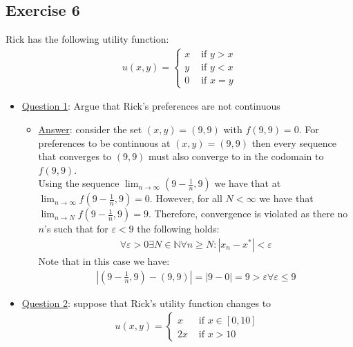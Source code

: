 \documentclass{article}
\begin{document}
\subsection{Exercise 6}
Rick has the following utility function:
\begin{gather*}
  u(x,y) =
  \begin{cases}
    x & \text{ if } y > x \\
    y & \text{ if } y < x \\
    0 & \text{ if } x = y
   \end{cases}
\end{gather*}
\par \vspace{0.3em}
\begin{itemize}
  \item  \underline{Question 1}: Argue that Rick's preferences are not continuous
  \begin{itemize}
    \item  \underline{Answer}: consider the set $(x,y) = (9,9)$ with $f(9,9) = 0$. For preferences to be continuous at $(x,y) = (9,9)$ then every sequence that converges to $(9,9)$ must also converge to in the codomain to $f(9,9)$.\\ Using the sequence $\lim_{n \rightarrow \infty} (9 - \tfrac{1}{n}, 9)$ we have that at $\lim_{n \rightarrow \infty} f(9 - \tfrac{1}{n}, 9) = 0$. However, for all $N < \infty$ we have that $\lim_{n \rightarrow N} f(9 - \tfrac{1}{n}, 9) = 9$. Therefore, convergence is violated as there no $n$'s such that for $\varepsilon < 9$ the following holds:
    \begin{gather*}
      \forall \varepsilon > 0 \exists N \in \mathbb{N} \forall n \geq N: |x_{n} - x^{*}| < \varepsilon
    \end{gather*}
    Note that in this case we have:
    \begin{gather*}
      |(9 - \frac{1}{n}, 9) - (9, 9)| = |9 - 0| = 9 > \varepsilon \forall \varepsilon \leq 9
    \end{gather*}
  \end{itemize}
  \item  \underline{Question 2}: suppose that Rick's utility function changes to
  \begin{gather*}
    u(x,y) =
    \begin{cases}
      x & \text{ if } x \in [0,10] \\
      2x & \text{ if } x > 10
     \end{cases}
  \end{gather*}

\end{itemize}
\end{document}
